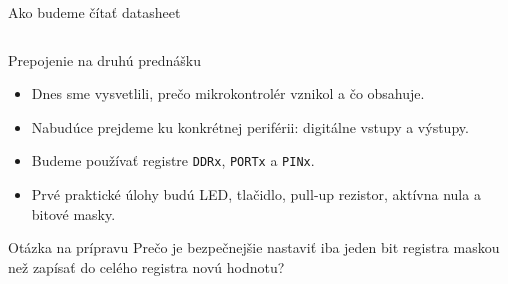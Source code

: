 \begin{frame}{Ako budeme čítať datasheet}
\begin{columns}[T,onlytextwidth]
\end{columns}
\end{frame}

\begin{frame}{Prepojenie na druhú prednášku}
\begin{itemize}
  \item Dnes sme vysvetlili, prečo mikrokontrolér vznikol a čo obsahuje.
  \item Nabudúce prejdeme ku konkrétnej periférii: digitálne vstupy a výstupy.
  \item Budeme používať registre \texttt{DDRx}, \texttt{PORTx} a \texttt{PINx}.
  \item Prvé praktické úlohy budú LED, tlačidlo, pull-up rezistor, aktívna nula a bitové masky.
\end{itemize}
\begin{alertblock}{Otázka na prípravu}
Prečo je bezpečnejšie nastaviť iba jeden bit registra maskou než zapísať do celého registra novú hodnotu?
\end{alertblock}
\end{frame}
